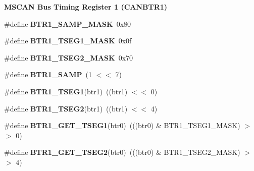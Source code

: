 \begin{Indent}\textbf{ M\+S\+C\+AN Bus Timing Register 1 (C\+A\+N\+B\+T\+R1)}\par
\begin{DoxyCompactItemize}
\item 
\#define {\bfseries B\+T\+R1\+\_\+\+S\+A\+M\+P\+\_\+\+M\+A\+SK}~0x80
\item 
\#define {\bfseries B\+T\+R1\+\_\+\+T\+S\+E\+G1\+\_\+\+M\+A\+SK}~0x0f
\item 
\#define {\bfseries B\+T\+R1\+\_\+\+T\+S\+E\+G2\+\_\+\+M\+A\+SK}~0x70
\item 
\#define {\bfseries B\+T\+R1\+\_\+\+S\+A\+MP}~(1 $<$$<$ 7)
\item 
\#define {\bfseries B\+T\+R1\+\_\+\+T\+S\+E\+G1}(btr1)~((btr1) $<$$<$ 0)
\item 
\#define {\bfseries B\+T\+R1\+\_\+\+T\+S\+E\+G2}(btr1)~((btr1) $<$$<$ 4)
\item 
\#define {\bfseries B\+T\+R1\+\_\+\+G\+E\+T\+\_\+\+T\+S\+E\+G1}(btr0)~(((btr0) \& B\+T\+R1\+\_\+\+T\+S\+E\+G1\+\_\+\+M\+A\+SK) $>$$>$ 0)
\item 
\#define {\bfseries B\+T\+R1\+\_\+\+G\+E\+T\+\_\+\+T\+S\+E\+G2}(btr0)~(((btr0) \& B\+T\+R1\+\_\+\+T\+S\+E\+G2\+\_\+\+M\+A\+SK) $>$$>$ 4)
\end{DoxyCompactItemize}
\end{Indent}
